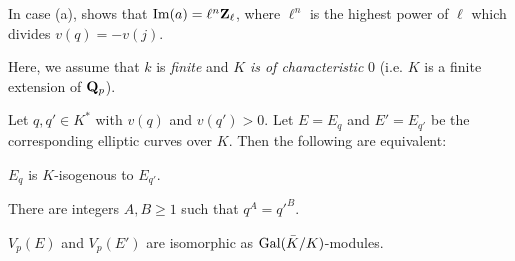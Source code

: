 
In case (a), shows that $\mathrm{Im}(a)=\ell^n\mathbf{Z}_\ell$, where $\ell^n$ is the
highest power of $\ell$ which divides $v(q)=-v(j)$.


Here, we assume that $k$ is \emph{finite} and $K$ \emph{is of
characteristic} $0$ (i.e. $K$ is a finite extension of $\mathbf{Q}_p$).

\begin{theorem}
Let $q, q'\in K^*$ with $v(q)$ and $v(q')>0$. Let $E=E_q$ and $E'=E_{q'}$
be the corresponding elliptic curves over $K$. Then the following are
equivalent:
\begin{alist}
\item[(1)] $E_q$ is $K$-isogenous to $E_{q'}$.
\item[(2)] There are integers $A, B\geq 1$ such that $q^A=q'^B$.
\item[(3)] $V_p(E)$ and $V_p(E')$ are isomorphic as
$\mathrm{Gal}(\bar K/K)$-modules.
\end{alist}
\end{theorem}

